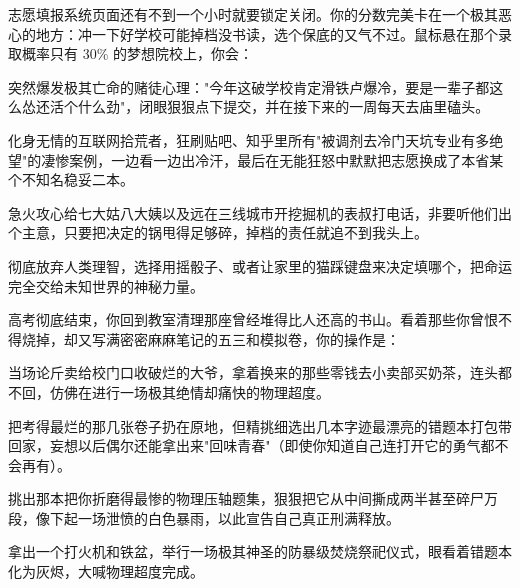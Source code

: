 \documentclass{exam-zh}
\begin{document}
\begin{question}[points = 5]
  志愿填报系统页面还有不到一个小时就要锁定关闭。你的分数完美卡在一个极其恶心的地方：冲一下好学校可能掉档没书读，选个保底的又气不过。鼠标悬在那个录取概率只有 30\% 的梦想院校上，你会：
  \begin{choices}
    \item 突然爆发极其亡命的赌徒心理："今年这破学校肯定滑铁卢爆冷，要是一辈子都这么怂还活个什么劲"，闭眼狠狠点下提交，并在接下来的一周每天去庙里磕头。
    \item 化身无情的互联网拾荒者，狂刷贴吧、知乎里所有"被调剂去冷门天坑专业有多绝望"的凄惨案例，一边看一边出冷汗，最后在无能狂怒中默默把志愿换成了本省某个不知名稳妥二本。
    \item 急火攻心给七大姑八大姨以及远在三线城市开挖掘机的表叔打电话，非要听他们出个主意，只要把决定的锅甩得足够碎，掉档的责任就追不到我头上。
    \item 彻底放弃人类理智，选择用摇骰子、或者让家里的猫踩键盘来决定填哪个，把命运完全交给未知世界的神秘力量。
  \end{choices}
\end{question}

\begin{question}[points = 5]
  高考彻底结束，你回到教室清理那座曾经堆得比人还高的书山。看着那些你曾恨不得烧掉，却又写满密密麻麻笔记的五三和模拟卷，你的操作是：
  \begin{choices}
    \item 当场论斤卖给校门口收破烂的大爷，拿着换来的那些零钱去小卖部买奶茶，连头都不回，仿佛在进行一场极其绝情却痛快的物理超度。
    \item 把考得最烂的那几张卷子扔在原地，但精挑细选出几本字迹最漂亮的错题本打包带回家，妄想以后偶尔还能拿出来"回味青春"（即使你知道自己连打开它的勇气都不会再有）。
    \item 挑出那本把你折磨得最惨的物理压轴题集，狠狠把它从中间撕成两半甚至碎尸万段，像下起一场泄愤的白色暴雨，以此宣告自己真正刑满释放。
    \item 拿出一个打火机和铁盆，举行一场极其神圣的防暴级焚烧祭祀仪式，眼看着错题本化为灰烬，大喊物理超度完成。
  \end{choices}
\end{question}
\end{document}
